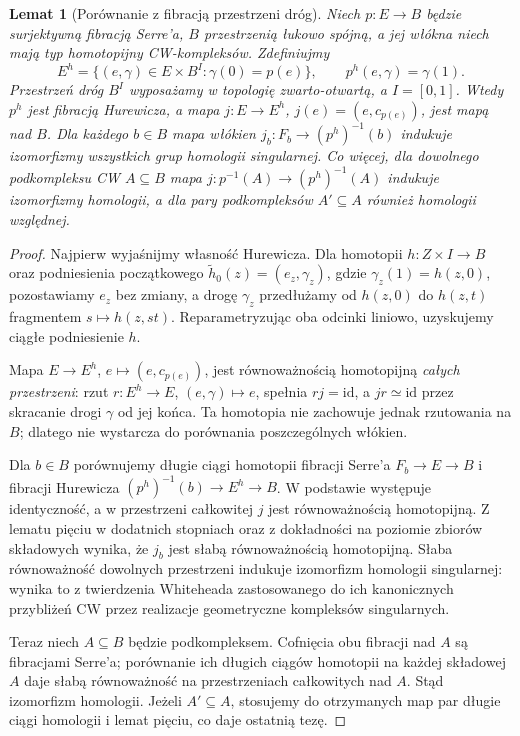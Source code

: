 \documentclass[11pt,a4paper,oneside]{report}
\newcommand{\id}{\mathrm{id}}
\theoremstyle{plain}
\newtheorem{lemat}[twierdzenie]{Lemat}
\theoremstyle{definition}
\theoremstyle{remark}
\begin{document}
\begin{lemat}[Porównanie z fibracją przestrzeni dróg]
\label{lem:serre-mappingpath-v6}
Niech $p:E\to B$ będzie surjektywną fibracją Serre'a, $B$ przestrzenią
łukowo spójną, a jej włókna niech mają typ homotopijny CW-kompleksów.
Zdefiniujmy
\[
E^h=\{(e,\gamma)\in E\times B^I:\gamma(0)=p(e)\},\qquad
p^h(e,\gamma)=\gamma(1).
\]
Przestrzeń dróg $B^I$ wyposażamy w topologię zwarto-otwartą,
a $I=[0,1]$. Wtedy $p^h$ jest fibracją Hurewicza, a mapa
$j:E\to E^h$, $j(e)=(e,c_{p(e)})$, jest mapą nad $B$.
Dla każdego $b\in B$ mapa włókien
$j_b:F_b\to (p^h)^{-1}(b)$ indukuje izomorfizmy
wszystkich grup homologii singularnej.
Co więcej, dla dowolnego podkompleksu CW $A\subseteq B$
mapa $j:p^{-1}(A)\to(p^h)^{-1}(A)$ indukuje
izomorfizmy homologii, a dla pary podkompleksów
$A'\subseteq A$ również homologii względnej.
\end{lemat}
\begin{proof}
Najpierw wyjaśnijmy własność Hurewicza. Dla homotopii
$h:Z\times I\to B$ oraz podniesienia początkowego
$\widetilde h_0(z)=(e_z,\gamma_z)$, gdzie
$\gamma_z(1)=h(z,0)$, pozostawiamy $e_z$ bez zmiany,
a drogę $\gamma_z$ przedłużamy od $h(z,0)$ do $h(z,t)$
fragmentem $s\mapsto h(z,st)$. Reparametryzując oba
odcinki liniowo, uzyskujemy ciągłe podniesienie $h$.

Mapa $E\to E^h$, $e\mapsto(e,c_{p(e)})$, jest
równoważnością homotopijną \emph{całych przestrzeni}: rzut
$r:E^h\to E$, $(e,\gamma)\mapsto e$, spełnia $rj=\id$,
a $jr\simeq\id$ przez skracanie drogi $\gamma$ od jej końca.
Ta homotopia nie zachowuje jednak rzutowania na $B$;
dlatego nie wystarcza do porównania poszczególnych włókien.

Dla $b\in B$ porównujemy długie ciągi homotopii
fibracji Serre'a $F_b\to E\to B$ i fibracji Hurewicza
$(p^h)^{-1}(b)\to E^h\to B$. W podstawie występuje
identyczność, a w przestrzeni całkowitej $j$ jest
równoważnością homotopijną. Z lematu pięciu w dodatnich
stopniach oraz z dokładności na poziomie zbiorów składowych
wynika, że $j_b$ jest słabą równoważnością homotopijną.
Słaba równoważność dowolnych przestrzeni indukuje
izomorfizm homologii singularnej: wynika to z twierdzenia
Whiteheada zastosowanego do ich kanonicznych przybliżeń CW
przez realizacje geometryczne kompleksów singularnych.

Teraz niech $A\subseteq B$ będzie podkompleksem.
Cofnięcia obu fibracji nad $A$ są fibracjami Serre'a;
porównanie ich długich ciągów homotopii na każdej składowej
$A$ daje słabą równoważność na przestrzeniach całkowitych
nad $A$. Stąd izomorfizm homologii. Jeżeli
$A'\subseteq A$, stosujemy do otrzymanych map par
długie ciągi homologii i lemat pięciu, co daje ostatnią tezę.
\end{proof}
\end{document}
